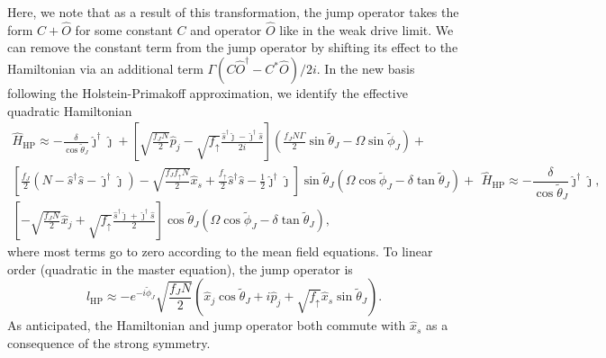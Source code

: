 Here, we note that as a result of this transformation, the jump operator takes the form $C + \hat O$ for some constant $C$ and operator $\hat O$ like in the weak drive limit. We can remove the constant term from the jump operator by shifting its effect to the Hamiltonian via an additional term $\Gamma (C \hat{O}^\dagger - C^* \hat O)/2i$.
In the new basis following the Holstein-Primakoff approximation, we identify the effective quadratic Hamiltonian
\begin{subequations}
\begin{multline}
    \hat H_{\text{HP}} \approx -\frac{\delta}{\cos \tilde{\theta}_J} \hat \jmath^\dagger \hat \jmath + \left[\sqrt{\frac{f_J N}{2}} \hat p_j - \sqrt{f_{\uparrow}} \frac{\hat s^\dagger \hat \jmath - \hat \jmath^\dagger \hat s}{2i} \right] \left( \frac{f_J N \Gamma}{2} \sin \tilde{\theta}_J - \Omega \sin \tilde{\phi}_J \right) +\\
    \left[\frac{f_J }{2}(N-\hat{s}^\dagger \hat s - \hat{\jmath}^\dagger \hat \jmath) - \sqrt{\frac{f_J f_{\uparrow} N}{2}} \hat x_s  + \frac{f_{\uparrow}}{2} \hat s^\dagger \hat s -\frac{1}{2} \hat \jmath^\dagger \hat \jmath \right] \sin \tilde{\theta}_J  \left( \Omega \cos \tilde{\phi}_J - \delta \tan \tilde{\theta}_J \right) + \\
    \left[-\sqrt{\frac{ f_J N}{2}}  \hat x_j  + \sqrt{f_{\uparrow}} \frac{\hat s^\dagger \hat \jmath + \hat \jmath^\dagger \hat s}{2}\right] \cos \tilde{\theta}_J  \left( \Omega \cos \tilde{\phi}_J - \delta \tan \tilde{\theta}_J \right),
\end{multline}
\begin{equation}
    \hat H_{\text{HP}} \approx -\frac{\delta}{\cos \tilde{\theta}_J} \hat \jmath^\dagger \hat \jmath,
\end{equation}
\end{subequations}
where most terms go to zero according to the mean field equations.
To linear order (quadratic in the master equation), the jump operator is
\begin{equation}
    \hat l_{\text{HP}} \approx -e^{- i \tilde{\phi}_J} \sqrt{\frac{f_J N}{2}}\left(\hat x_j \cos \tilde{\theta}_J + i \hat p_j + \sqrt{f_{\uparrow}} \hat x_s \sin \tilde{\theta}_J \right).
\end{equation}
As anticipated, the Hamiltonian and jump operator both commute with $\hat x_s$ as a consequence of the strong symmetry.


